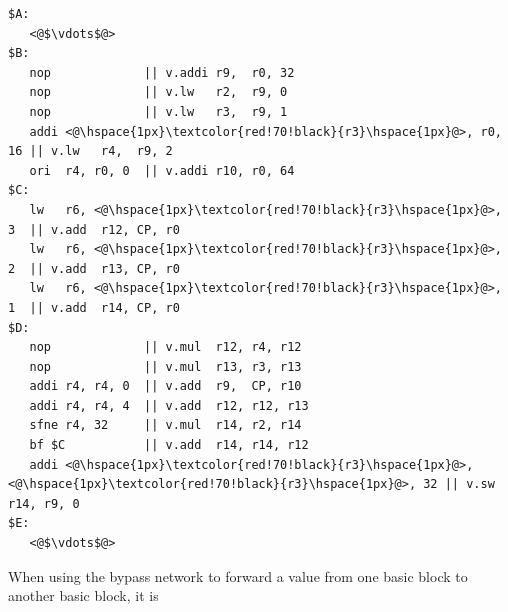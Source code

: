 \begin{lstlisting}
$A:
   <@$\vdots$@>
$B:
   nop             || v.addi r9,  r0, 32
   nop             || v.lw   r2,  r9, 0
   nop             || v.lw   r3,  r9, 1
   addi <@\hspace{1px}\textcolor{red!70!black}{r3}\hspace{1px}@>, r0, 16 || v.lw   r4,  r9, 2
   ori  r4, r0, 0  || v.addi r10, r0, 64
$C:
   lw   r6, <@\hspace{1px}\textcolor{red!70!black}{r3}\hspace{1px}@>, 3  || v.add  r12, CP, r0
   lw   r6, <@\hspace{1px}\textcolor{red!70!black}{r3}\hspace{1px}@>, 2  || v.add  r13, CP, r0
   lw   r6, <@\hspace{1px}\textcolor{red!70!black}{r3}\hspace{1px}@>, 1  || v.add  r14, CP, r0
$D:
   nop             || v.mul  r12, r4, r12
   nop             || v.mul  r13, r3, r13
   addi r4, r4, 0  || v.add  r9,  CP, r10
   addi r4, r4, 4  || v.add  r12, r12, r13
   sfne r4, 32     || v.mul  r14, r2, r14
   bf $C           || v.add  r14, r14, r12
   addi <@\hspace{1px}\textcolor{red!70!black}{r3}\hspace{1px}@>, <@\hspace{1px}\textcolor{red!70!black}{r3}\hspace{1px}@>, 32 || v.sw   r14, r9, 0
$E:
   <@$\vdots$@>
\end{lstlisting}

When using the bypass network to forward a value from one basic block to another basic block, it is 

